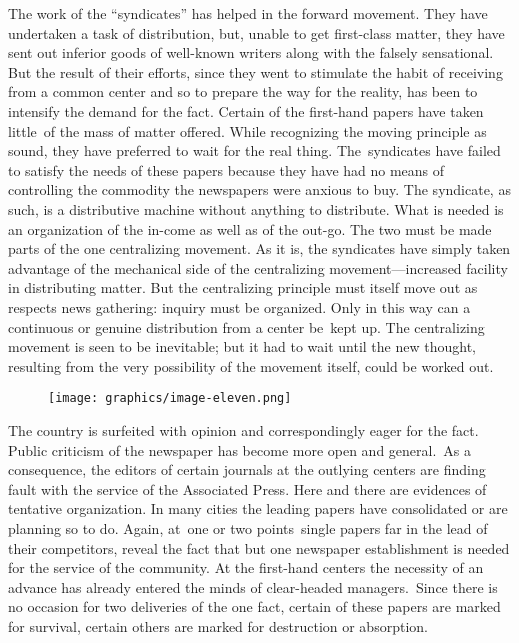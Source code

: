 \documentclass[twoside,symmetric,nobib,justified]{tufte-book}
\begin{document}
The work of the ``syndicates'' has helped in the forward movement. They
have undertaken a task of distribution, but, unable to get first-class
matter, they have sent out inferior goods of well-known writers along
with the falsely sensational. But the result of their efforts, since
they went to stimulate the habit of receiving from a common center and
so to prepare the way for the reality, has been to intensify the demand
for the fact. Certain of the first-hand papers have taken little~of the
mass of matter offered. While recognizing the moving principle as sound,
they have preferred to wait for the real thing. The~syndicates have
failed to satisfy the needs of these papers because they have had no
means of controlling the commodity the newspapers were anxious to buy.
The syndicate, as such, is a distributive machine without anything to
distribute. What is needed is an organization of the in-come as well as
of the out-go. The two must be made parts of the one centralizing
movement. As it is, the syndicates have simply taken advantage of the
mechanical side of the centralizing movement---increased facility in
distributing matter. But the centralizing principle must itself move out
as respects news gathering: inquiry must be organized. Only in this way
can a continuous or genuine distribution from a center be~kept up. The
centralizing movement is seen to be inevitable; but it had to wait until
the new thought, resulting from the very possibility of the movement
itself, could be worked out.

\begin{figure}
   \texttt{[image: graphics/image-eleven.png]}
   \label{fig:fig11}
\end{figure}

The country is surfeited with opinion and correspondingly eager for the
fact. Public criticism of the newspaper has become more open and
general.~As a consequence, the editors of certain journals at the
outlying centers are finding fault with the service of the Associated
Press. Here and there are evidences of tentative organization. In many
cities the leading papers have consolidated or are planning so to do.
Again, at~one or two points~single papers far in the lead of their
competitors, reveal the fact that but one newspaper establishment is
needed for the service of the community. At the first-hand centers the
necessity of an advance has already entered the minds of clear-headed
managers.~Since there is no occasion for two deliveries of the one fact,
certain of these papers are marked for survival, certain others are
marked for destruction or absorption.~
\end{document}
